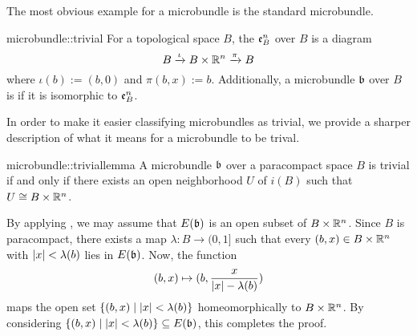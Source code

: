 \begin{myparagraph}
    The most obvious example for a microbundle is the standard microbundle.
\end{myparagraph}

\begin{myexample}{microbundle::trivial}
    For a topological space $B$, the  $\mathfrak{e}^{n}_B$ over $B$ is a diagram
    \[ B \xrightarrow{\iota} B \times \mathbb{R}^n \xrightarrow{\pi} B{} \]
    where $\iota(b) := (b, 0)$ and $\pi(b, x) := b$.
    Additionally, a microbundle $\mathfrak{b}$ over $B$ is  if it is isomorphic to $\mathfrak{e}^{n}_B$.
\end{myexample}

\begin{myparagraph}
    In order to make it easier classifying microbundles as trivial,
    we provide a sharper description of what it means for a microbundle to be trival. 
\end{myparagraph}

\begin{mylemma}{microbundle::triviallemma}
    A microbundle $\mathfrak{b}$ over a paracompact space $B$ is trivial if and only if there exists an open neighborhood $U$ of $i(B)$ such that $U \cong B \times \mathbb{R}^n$.
\end{mylemma}
\begin{myproof}
    By applying , we may assume that $E(\mathfrak{b})$ is an open subset of $B \times \mathbb{R}^n$.
    Since $B$ is paracompact, there exists a map $\lambda: B \to (0, 1]$ such that every $(b, x) \in B \times \mathbb{R}^n$ with $\vert{} x \vert{} < \lambda(b)$ lies in $E(\mathfrak{b})$.
    Now, the function
    \[ (b, x) \mapsto (b, \frac{x}{\vert{} x \vert{} - \lambda(b)}) \]
    maps the open set $\{(b, x) \mid \vert{} x \vert{} < \lambda(b)\}$ homeomorphically to $B \times \mathbb{R}^n$.
    By considering $\{(b, x) \mid \vert{} x \vert{} < \lambda(b)\} \subseteq{} E(\mathfrak{b})$, this completes the proof.
\end{myproof}